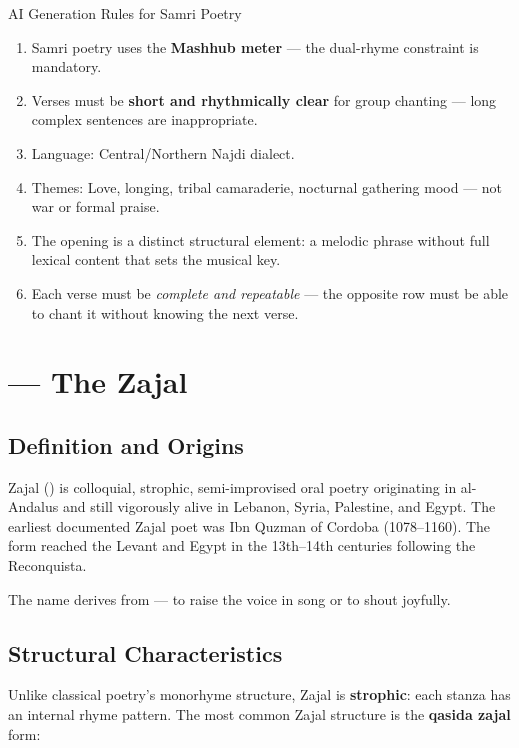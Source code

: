 \begin{rulebox}{AI Generation Rules for Samri Poetry}
\begin{enumerate}
  \item Samri poetry uses the \textbf{Mashhub meter} — the dual-rhyme constraint is mandatory.
  \item Verses must be \textbf{short and rhythmically clear} for group chanting — long complex sentences are inappropriate.
  \item Language: Central/Northern Najdi dialect.
  \item Themes: Love, longing, tribal camaraderie, nocturnal gathering mood — not war or formal praise.
  \item The  opening is a distinct structural element: a melodic phrase without full lexical content that sets the musical key.
  \item Each verse must be \textit{complete and repeatable} — the opposite row must be able to chant it without knowing the next verse.
\end{enumerate}
\end{rulebox}

\section{ — The Zajal}
\label{sec:zajal}

\subsection{Definition and Origins}

Zajal () is colloquial, strophic, semi-improvised oral poetry originating in al-Andalus and still vigorously alive in Lebanon, Syria, Palestine, and Egypt. The earliest documented Zajal poet was Ibn Quzman of Cordoba (1078–1160). The form reached the Levant and Egypt in the 13th–14th centuries following the Reconquista.

The name derives from  — to raise the voice in song or to shout joyfully.

\subsection{Structural Characteristics}

Unlike classical poetry's monorhyme structure, Zajal is \textbf{strophic}: each stanza has an internal rhyme pattern. The most common Zajal structure is the \textbf{qasida zajal} form:

